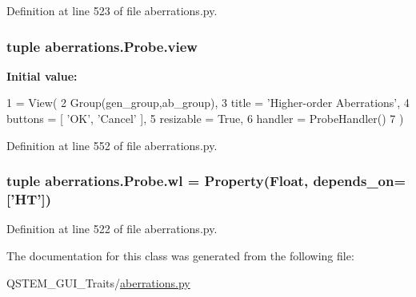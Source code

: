 Definition at line 523 of file aberrations.\-py.

\hypertarget{classaberrations_1_1_probe_a321f4dd1122df9da6e42a190d93d2883}{
\subsubsection[{view}]{\setlength{\rightskip}{0pt plus 5cm}tuple aberrations.\-Probe.\-view\hspace{0.3cm}{\ttfamily [static]}}}\label{classaberrations_1_1_probe_a321f4dd1122df9da6e42a190d93d2883}
{\bfseries Initial value\-:}
\begin{DoxyCode}
1 = View(
2         Group(gen\_group,ab\_group),
3         title     = \textcolor{stringliteral}{'Higher-order Aberrations'},
4         buttons   = [ \textcolor{stringliteral}{'OK'}, \textcolor{stringliteral}{'Cancel'} ],
5         resizable = \textcolor{keyword}{True},
6         handler   = ProbeHandler()
7         )
\end{DoxyCode}


Definition at line 552 of file aberrations.\-py.

\hypertarget{classaberrations_1_1_probe_adb91a6ae085cbb9a4c3199fb5cba63f0}{
\subsubsection[{wl}]{\setlength{\rightskip}{0pt plus 5cm}tuple aberrations.\-Probe.\-wl = Property(Float, depends\-\_\-on=\mbox{[}'{\bf H\-T}'\mbox{]})\hspace{0.3cm}{\ttfamily [static]}}}\label{classaberrations_1_1_probe_adb91a6ae085cbb9a4c3199fb5cba63f0}


Definition at line 522 of file aberrations.\-py.



The documentation for this class was generated from the following file\-:\begin{DoxyCompactItemize}
\item 
Q\-S\-T\-E\-M\-\_\-\-G\-U\-I\-\_\-\-Traits/\hyperlink{aberrations_8py}{aberrations.\-py}\end{DoxyCompactItemize}

